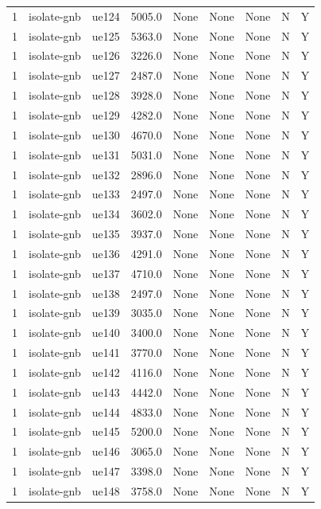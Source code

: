 \begin{table}[ht]
\begin{tabular}{|c|c|c|c|c|c|c|c|c|}
1 & isolate-gnb & ue124 & 5005.0 & None & None & None & N & Y \\
1 & isolate-gnb & ue125 & 5363.0 & None & None & None & N & Y \\
1 & isolate-gnb & ue126 & 3226.0 & None & None & None & N & Y \\
1 & isolate-gnb & ue127 & 2487.0 & None & None & None & N & Y \\
1 & isolate-gnb & ue128 & 3928.0 & None & None & None & N & Y \\
1 & isolate-gnb & ue129 & 4282.0 & None & None & None & N & Y \\
1 & isolate-gnb & ue130 & 4670.0 & None & None & None & N & Y \\
1 & isolate-gnb & ue131 & 5031.0 & None & None & None & N & Y \\
1 & isolate-gnb & ue132 & 2896.0 & None & None & None & N & Y \\
1 & isolate-gnb & ue133 & 2497.0 & None & None & None & N & Y \\
1 & isolate-gnb & ue134 & 3602.0 & None & None & None & N & Y \\
1 & isolate-gnb & ue135 & 3937.0 & None & None & None & N & Y \\
1 & isolate-gnb & ue136 & 4291.0 & None & None & None & N & Y \\
1 & isolate-gnb & ue137 & 4710.0 & None & None & None & N & Y \\
1 & isolate-gnb & ue138 & 2497.0 & None & None & None & N & Y \\
1 & isolate-gnb & ue139 & 3035.0 & None & None & None & N & Y \\
1 & isolate-gnb & ue140 & 3400.0 & None & None & None & N & Y \\
1 & isolate-gnb & ue141 & 3770.0 & None & None & None & N & Y \\
1 & isolate-gnb & ue142 & 4116.0 & None & None & None & N & Y \\
1 & isolate-gnb & ue143 & 4442.0 & None & None & None & N & Y \\
1 & isolate-gnb & ue144 & 4833.0 & None & None & None & N & Y \\
1 & isolate-gnb & ue145 & 5200.0 & None & None & None & N & Y \\
1 & isolate-gnb & ue146 & 3065.0 & None & None & None & N & Y \\
1 & isolate-gnb & ue147 & 3398.0 & None & None & None & N & Y \\
1 & isolate-gnb & ue148 & 3758.0 & None & None & None & N & Y \\

\end{tabular}
\end{table}
